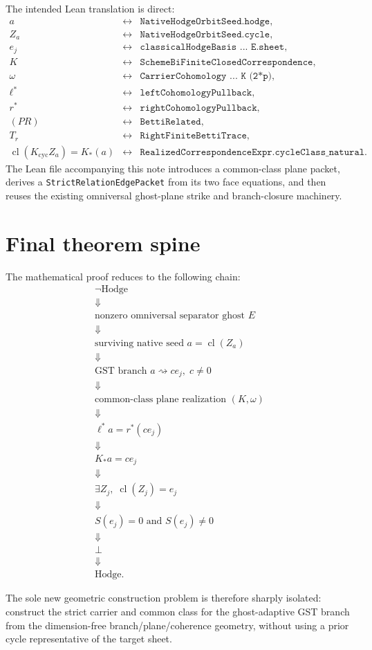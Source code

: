 \documentclass[11pt]{article}
\newcommand{\cl}{\operatorname{cl}}
\begin{document}
The intended Lean translation is direct:
\[
\begin{array}{rcl}
  a &\leftrightarrow& \texttt{NativeHodgeOrbitSeed.hodge},\\
  Z_a &\leftrightarrow& \texttt{NativeHodgeOrbitSeed.cycle},\\
  e_j &\leftrightarrow& \texttt{classicalHodgeBasis ... E.sheet},\\
  K &\leftrightarrow& \texttt{SchemeBiFiniteClosedCorrespondence},\\
  \omega &\leftrightarrow& \texttt{CarrierCohomology ... K (2*p)},\\
  \ell^* &\leftrightarrow& \texttt{leftCohomologyPullback},\\
  r^* &\leftrightarrow& \texttt{rightCohomologyPullback},\\
  (PR) &\leftrightarrow& \texttt{BettiRelated},\\
  T_r &\leftrightarrow& \texttt{RightFiniteBettiTrace},\\
  \cl(K_{\mathrm{cyc}}Z_a)=K_*(a)
    &\leftrightarrow& \texttt{RealizedCorrespondenceExpr.cycleClass_natural}.
\end{array}
\]
The Lean file accompanying this note introduces a common-class plane packet,
derives a \texttt{StrictRelationEdgePacket} from its two face equations, and
then reuses the existing omniversal ghost-plane strike and branch-closure
machinery.

\section{Final theorem spine}

The mathematical proof reduces to the following chain:
\[
\boxed{
\begin{array}{c}
\neg\mathrm{Hodge}\\
\Downarrow\\
\text{nonzero omniversal separator ghost }E\\
\Downarrow\\
\text{surviving native seed }a=\cl(Z_a)\\
\Downarrow\\
\text{GST branch }a\rightsquigarrow c e_j,\;c\ne0\\
\Downarrow\\
\text{common-class plane realization }(K,\omega)\\
\Downarrow\\
\ell^*a=r^*(c e_j)\\
\Downarrow\\
K_*a=c e_j\\
\Downarrow\\
\exists Z_j,\;\cl(Z_j)=e_j\\
\Downarrow\\
S(e_j)=0\text{ and }S(e_j)\ne0\\
\Downarrow\\
\bot\\
\Downarrow\\
\mathrm{Hodge}.
\end{array}}
\]

The sole new geometric construction problem is therefore sharply isolated:
construct the strict carrier and common class for the ghost-adaptive GST branch
from the dimension-free branch/plane/coherence geometry, without using a prior
cycle representative of the target sheet.
\end{document}
